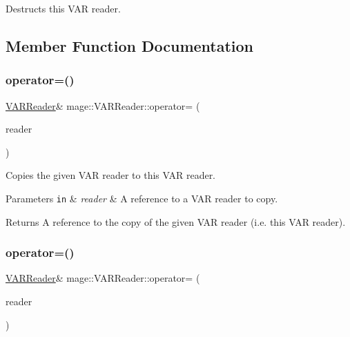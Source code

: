 Destructs this V\+AR reader. 

\subsection{Member Function Documentation}
\hypertarget{classmage_1_1_v_a_r_reader_a8ea4a08a1d66a8d177ac6e30ef13722c}{}\label{classmage_1_1_v_a_r_reader_a8ea4a08a1d66a8d177ac6e30ef13722c} 
\subsubsection{\texorpdfstring{operator=()}{operator=()}\hspace{0.1cm}{\footnotesize\ttfamily [1/2]}}
{\footnotesize\ttfamily \hyperlink{classmage_1_1_v_a_r_reader}{V\+A\+R\+Reader}\& mage\+::\+V\+A\+R\+Reader\+::operator= (\begin{DoxyParamCaption}\item[{const \hyperlink{classmage_1_1_v_a_r_reader}{V\+A\+R\+Reader} \&}]{reader }\end{DoxyParamCaption})\hspace{0.3cm}{\ttfamily [delete]}}

Copies the given V\+AR reader to this V\+AR reader.


\begin{DoxyParams}[1]{Parameters}
\mbox{\tt in}  & {\em reader} & A reference to a V\+AR reader to copy. \\
\hline
\end{DoxyParams}
\begin{DoxyReturn}{Returns}
A reference to the copy of the given V\+AR reader (i.\+e. this V\+AR reader). 
\end{DoxyReturn}
\hypertarget{classmage_1_1_v_a_r_reader_a7cf3c6fe1e27377d4a6ea914a11bc382}{}\label{classmage_1_1_v_a_r_reader_a7cf3c6fe1e27377d4a6ea914a11bc382} 
\subsubsection{\texorpdfstring{operator=()}{operator=()}\hspace{0.1cm}{\footnotesize\ttfamily [2/2]}}
{\footnotesize\ttfamily \hyperlink{classmage_1_1_v_a_r_reader}{V\+A\+R\+Reader}\& mage\+::\+V\+A\+R\+Reader\+::operator= (\begin{DoxyParamCaption}\item[{\hyperlink{classmage_1_1_v_a_r_reader}{V\+A\+R\+Reader} \&\&}]{reader }\end{DoxyParamCaption})\hspace{0.3cm}{\ttfamily [delete]}}

